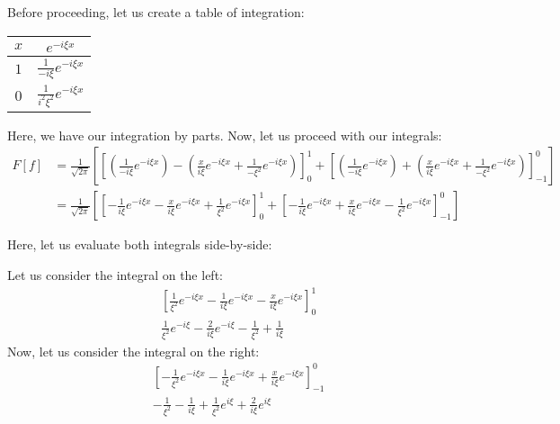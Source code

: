 \begin{enumerate}
Before proceeding, let us create a table of integration:

\begin{center}
  \begin{tabular}{c|c}
    $x$ &  $                    e^{-i \xi x}$\\
    \hline
    $1$ &  $\frac{1}{-i \xi}    e^{-i \xi x}$\\
    \hline
    $0$ &  $\frac{1}{i^2 \xi^2} e^{-i \xi x}$
  \end{tabular}
\end{center}

Here, we have our integration by parts. Now, let us proceed with our integrals:
%
\begin{align}
  F[f]
  & =
  \frac{1}{\sqrt{2 \pi}}
  \left[
    \left[
       \left(\frac{1}{-i \xi} e^{-i \xi x}\right)
     - \left(\frac{x}{ i \xi} e^{-i \xi x} + \frac{1}{-\xi^2} e^{-i \xi x}\right)
    \right]^1_0
  + \left[
      \left(\frac{1}{-i \xi} e^{-i \xi x}\right)
    + \left(\frac{x}{ i \xi} e^{-i \xi x} + \frac{1}{-\xi^2} e^{-i \xi x}\right)
    \right]^0_{-1}
  \right]\\
  & =
  \frac{1}{\sqrt{2 \pi}}
  \left[
    \left[
     - \frac{1}{ i \xi} e^{-i \xi x}
     - \frac{x}{ i \xi} e^{-i \xi x}
     + \frac{1}{ \xi^2} e^{-i \xi x}
    \right]^1_0
  + \left[
    - \frac{1}{ i \xi} e^{-i \xi x}
    + \frac{x}{ i \xi} e^{-i \xi x}
    - \frac{1}{ \xi^2} e^{-i \xi x}
    \right]^0_{-1}
  \right]
\end{align}

Here, let us evaluate both integrals side-by-side:
\newpage
\begin{multicols}{2}
  Let us consider the integral on the left:
\begin{align}
  &
  \left[
     \frac{1}{ \xi^2} e^{-i \xi x}
   - \frac{1}{ i \xi} e^{-i \xi x}
   - \frac{x}{ i \xi} e^{-i \xi x}
  \right]^1_0\\
  &
  \frac{1}{ \xi^2} e^{-i \xi}
- \frac{2}{ i \xi} e^{-i \xi}
- \frac{1}{ \xi^2}
+ \frac{1}{ i \xi}
\end{align}
  Now, let us consider the integral on the right:
\begin{align}
  &
  \left[
  - \frac{1}{ \xi^2} e^{-i \xi x}
  - \frac{1}{ i \xi} e^{-i \xi x}
  + \frac{x}{ i \xi} e^{-i \xi x}
  \right]^0_{-1}\\
  &
- \frac{1}{ \xi^2}
- \frac{1}{ i \xi}
+ \frac{1}{ \xi^2} e^{i \xi}
+ \frac{2}{ i \xi} e^{i \xi}
\end{align}
\end{multicols}


\end{enumerate}

